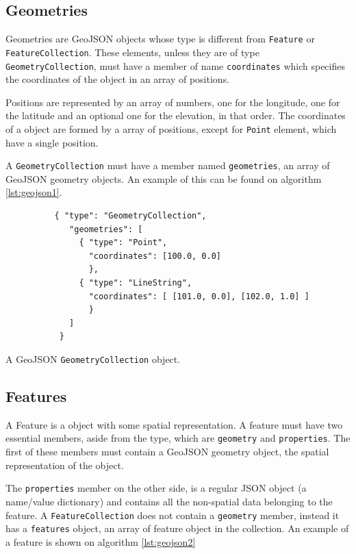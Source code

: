 \subsection*{Geometries}

Geometries are GeoJSON objects whose type is different from \texttt{Feature} or \texttt{FeatureCollection}. These elements, unless they are of type \texttt{GeometryCollection}, must have a member of name \texttt{coordinates} which specifies the coordinates of the object in an array of positions.

Positions are represented by an array of numbers, one for the longitude, one for the latitude and an optional one for the elevation, in that order. The coordinates of a object are formed by a array of positions, except for \texttt{Point} element, which have a single position.

A \texttt{GeometryCollection} must have a member named \texttt{geometries}, an array of GeoJSON geometry objects. An example of this can be found on algorithm \ref{lst:geojson1}.

\begin{listing}\centering
  \begin{minipage}{.6\textwidth}
    \begin{verbatim}
	      { "type": "GeometryCollection",
	         "geometries": [
	           { "type": "Point",
	             "coordinates": [100.0, 0.0]
	             },
	           { "type": "LineString",
	             "coordinates": [ [101.0, 0.0], [102.0, 1.0] ]
	             }
	         ]
	       }
    \end{verbatim}
  \end{minipage}
  \caption{A GeoJSON \texttt{GeometryCollection} object.}\label{lst:geojson1}
\end{listing}

\subsection*{Features}

A Feature is a object with some spatial representation. A feature must have two essential members, aside from the type, which are \texttt{geometry} and \texttt{properties}. The first of these members must contain a GeoJSON geometry object, the spatial representation of the object.

The \texttt{properties} member on the other side, is a regular JSON object (a name/value dictionary) and contains all the non-spatial data belonging to the feature. A \texttt{FeatureCollection} does not contain a \texttt{geometry} member, instead it has a \texttt{features} object, an array of feature object in the collection. An example of a feature is shown on algorithm \ref{lst:geojson2}

